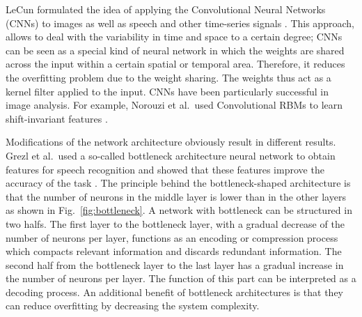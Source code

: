 \documentclass{article}
\begin{document}
LeCun formulated the idea of applying the Convolutional Neural Networks (CNNs) to images as well as speech and other time-series signals \cite{lecun1995convolutional}. This approach, allows to deal with the variability in time and space to a certain degree; CNNs can be seen as a special kind of neural network in which the weights are shared across the input within a certain spatial or temporal area. Therefore, it reduces the overfitting problem due to the weight sharing. The weights thus act as a kernel filter applied to the input. CNNs have been particularly successful in image analysis. For example, Norouzi et al.\ used Convolutional RBMs to learn shift-invariant features \cite{norouzi2009stacks}. 

Modifications of the network architecture obviously result in different results. Grezl et al.\ used a so-called bottleneck architecture neural network to obtain features for speech recognition and showed that these features improve the accuracy of the task \cite{grezl2007probabilistic}. The principle behind the bottleneck-shaped architecture is that the number of neurons in the middle layer is lower than in the other layers as shown in Fig.~\ref{fig:bottleneck}. A network with bottleneck can be structured in two halfs. The first layer to the bottleneck layer, with a gradual decrease of the number of neurons per layer, functions as an encoding or compression process which compacts relevant information and discards redundant information. The second half from the bottleneck layer to the last layer has a gradual increase in the number of neurons per layer. The function of this part can be interpreted as a decoding process. An additional benefit of bottleneck architectures is that they can reduce overfitting by decreasing the system complexity.
\end{document}
